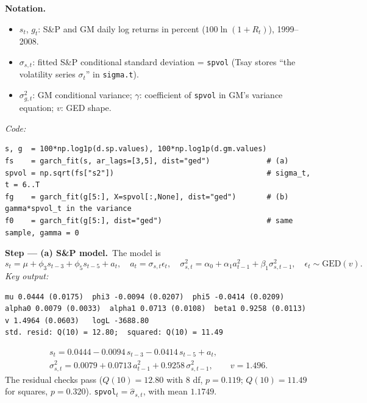 \documentclass[11pt,a4paper]{article}
\newenvironment{notacao}{\par\smallskip\noindent\textbf{Notation.}\begin{itemize}[leftmargin=1.4em,topsep=1pt,itemsep=0pt]\small}{\end{itemize}}
\newcommand{\passo}[2]{\par\smallskip\noindent\textbf{Step --- #1.}~#2}
\begin{document}
\begin{sol}
\begin{notacao}
\item $s_t$, $g_t$: S\&P and GM daily log returns in percent ($100\ln(1+R_t)$), 1999--2008.
\item $\sigma_{s,t}$: fitted S\&P conditional standard deviation = \texttt{spvol} (Tsay stores ``the volatility series $\sigma_t$'' in \texttt{sigma.t}).
\item $\sigma_{g,t}^2$: GM conditional variance; $\gamma$: coefficient of \texttt{spvol} in GM's variance equation; $v$: GED shape.
\end{notacao}
\noindent\textit{Code:}
\begingroup\footnotesize
\begin{verbatim}
s, g  = 100*np.log1p(d.sp.values), 100*np.log1p(d.gm.values)
fs    = garch_fit(s, ar_lags=[3,5], dist="ged")             # (a)
spvol = np.sqrt(fs["s2"])                                   # sigma_t, t = 6..T
fg    = garch_fit(g[5:], X=spvol[:,None], dist="ged")       # (b) gamma*spvol_t in the variance
f0    = garch_fit(g[5:], dist="ged")                        # same sample, gamma = 0
\end{verbatim}
\endgroup
\passo{(a) S\&P model}{The model is}
\begin{equation}\label{q314:sp} s_t=\mu+\phi_3s_{t-3}+\phi_5s_{t-5}+a_t,\quad a_t=\sigma_{s,t}\epsilon_t,\quad \sigma_{s,t}^2=\alpha_0+\alpha_1a_{t-1}^2+\beta_1\sigma_{s,t-1}^2,\quad \epsilon_t\sim\text{GED}(v) . \end{equation}
\noindent\textit{Key output:}
\begingroup\footnotesize
\begin{verbatim}
mu 0.0444 (0.0175)  phi3 -0.0094 (0.0207)  phi5 -0.0414 (0.0209)
alpha0 0.0079 (0.0033)  alpha1 0.0713 (0.0108)  beta1 0.9258 (0.0113)
v 1.4964 (0.0603)   logL -3688.80
std. resid: Q(10) = 12.80;  squared: Q(10) = 11.49
\end{verbatim}
\endgroup
\begin{gather*}
s_t=0.0444-0.0094\,s_{t-3}-0.0414\,s_{t-5}+a_t,\\
\sigma_{s,t}^2=0.0079+0.0713\,a_{t-1}^2+0.9258\,\sigma_{s,t-1}^2,\qquad v=1.496 .
\end{gather*}
The residual checks pass ($Q(10)=12.80$ with 8 df, $p=0.119$; $Q(10)=11.49$ for squares, $p=0.320$).
\texttt{spvol}$_t=\hat\sigma_{s,t}$, with mean $1.1749$.


\end{sol}
\end{document}
